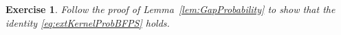 \documentclass[]{pcmi}
\theoremstyle{plain}
\newtheorem{exercise}[equation]{Exercise}
\theoremstyle{definition}
\newcommand{\km}[1]{\marginnote{\scriptsize\color{blue}#1}}
\begin{document}
\begin{exercise} Follow the proof of Lemma~\ref{lem:GapProbability} to show that the identity \eqref{eq:extKernelProbBFPS} holds.
\end{exercise}

\end{document}
